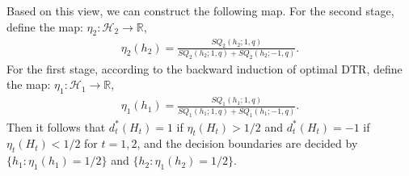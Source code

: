 \documentclass[10pt]{article}
\theoremstyle{remark} \newtheorem{rem}{Remark}
\begin{document}
Based on this view, we can construct the following map.
For the second stage, define the map: $\eta_2: \mathcal{H}_2\to\mathbb{R}$,
\begin{align}
    \eta_2(h_2) = \frac{SQ_2(h_2;1,q)}{SQ_2(h_2;1,q)+SQ_2(h_2;-1,q)}.
    \label{eta2}
\end{align}
For the first stage, according to the backward induction of optimal DTR, define the map: $\eta_1: \mathcal{H}_1\to\mathbb{R}$,
\begin{align}
    \eta_1(h_1) = \frac{SQ_1(h_1;1,q)}{SQ_1(h_1;1,q)+SQ_1(h_1;-1,q)}.
    \label{eta1}
\end{align}
Then it follows that $d^*_t(H_t) = 1$ if $\eta_t(H_t)>1/2$ and $d^*_t(H_t) = -1$ if $\eta_t(H_t)<1/2$ for $t=1,2$, and the decision boundaries are decided by $\{h_1:\eta_1(h_1)=1/2\}$ and $\{h_2:\eta_1(h_2)=1/2\}$.
\end{document}
